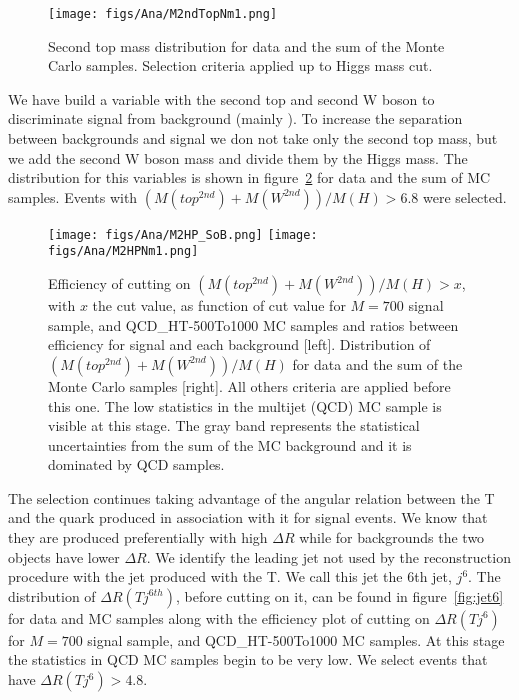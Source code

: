 \begin{figure}[!Hhtbp]
  \begin{center}
    \texttt{[image: figs/Ana/M2ndTopNm1.png]}
    \caption{Second top mass distribution for data and the sum of the Monte Carlo samples. Selection criteria applied up to Higgs mass cut.}
    \label{fig:2ndTM}
  \end{center}
\end{figure}

We have build a variable with the second top and second W boson to discriminate signal from background (mainly \ttbar). To increase the separation between backgrounds and signal we don not take only the second top mass, but we add the second W boson mass and divide them by the Higgs mass. The distribution for this variables is shown in figure~\ref{fig:m2thp} for data and the sum of MC samples. Events with $(M(top^{2nd})+M(W^{2nd}))/M(H)>6.8$ were selected.

\begin{figure}[!Hhtbp]
  \begin{center}
    \texttt{[image: figs/Ana/M2HP\_SoB.png]}
    \texttt{[image: figs/Ana/M2HPNm1.png]}
    \caption{Efficiency of cutting on $(M(top^{2nd})+M(W^{2nd}))/M(H)>x$, with $x$ the cut value, as function of cut value for $M=700$ \GeVcc signal sample, \ttbar and QCD\_HT-500To1000 MC samples and ratios between efficiency for signal and each background [left]. Distribution of $(M(top^{2nd})+M(W^{2nd}))/M(H)$ for data and the sum of the Monte Carlo samples [right]. All others criteria are applied before this one. The low statistics in the multijet (QCD) MC sample is visible at this stage. The gray band represents the statistical uncertainties from the sum of the MC background and it is dominated by QCD samples.}
    \label{fig:m2thp}
  \end{center}
\end{figure}

The selection continues taking advantage of the angular relation between the T and the quark produced in association with it for signal events. We know that they are produced preferentially with high $\Delta R$ while for backgrounds the two objects have lower $\Delta R$. We identify the leading jet not used by the reconstruction procedure with the jet produced with the T. We call this jet the 6th jet, $j^{6}$. The distribution of $\Delta R (T j^{6th})$, before cutting on it, can be found in figure~\ref{fig:jet6} for data and MC samples along with the efficiency plot of cutting on $\Delta R (T j^{6})$ for $M=700$ \GeVcc signal sample, \ttbar and QCD\_HT-500To1000 MC samples. At this stage the statistics in QCD MC samples begin to be very low. We select events that have $\Delta R (T j^{6})>4.8$. 

